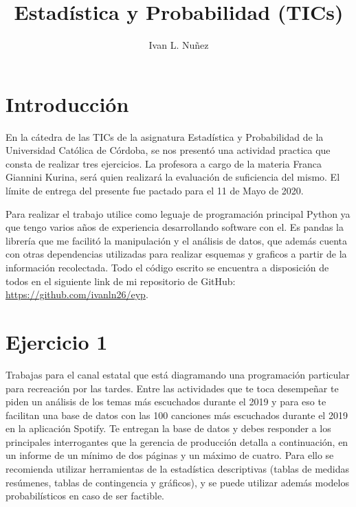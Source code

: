 \documentclass{article}
\title{Estadística y Probabilidad (TICs)}
\author{Ivan L. Nuñez}
\date{}
\begin{document}
\begin{titlepage}
  \maketitle
  \thispagestyle{empty}
\end{titlepage}

\newpage
\renewcommand{\contentsname}{Índice}
\tableofcontents

\newpage
\section{Introducción}
En la cátedra de las TICs de la asignatura Estadística y Probabilidad de la
Universidad Católica de Córdoba, se nos presentó una actividad practica que
consta de realizar tres ejercicios. La profesora a cargo de la materia Franca
Giannini Kurina, será quien realizará la evaluación de suficiencia del mismo.
El límite de entrega del presente fue pactado para el 11 de Mayo de 2020.

Para realizar el trabajo utilice como leguaje de programación principal
Python ya que tengo varios años de experiencia desarrollando software con el.
Es pandas la librería que me facilitó la manipulación y el análisis de datos,
que además cuenta con otras dependencias utilizadas para realizar esquemas y
graficos a partir de la información recolectada. Todo el código escrito se
encuentra a disposición de todos en el siguiente link de mi repositorio de
GitHub: \url{https://github.com/ivanln26/eyp}.

\newpage
\section{Ejercicio 1}
Trabajas para el canal estatal que está diagramando una programación particular
para recreación por las tardes. Entre las actividades que te toca desempeñar te
piden un análisis de los temas más escuchados durante el 2019 y para eso te
facilitan una base de datos con las 100 canciones más escuchados durante el
2019 en la aplicación Spotify. Te entregan la base de datos y debes responder a
los principales interrogantes que la gerencia de producción detalla a
continuación, en un informe de un mínimo de dos páginas y un máximo de cuatro.
Para ello se recomienda utilizar herramientas de la estadística descriptivas
(tablas de medidas resúmenes, tablas de contingencia y gráficos), y se puede
utilizar además modelos probabilísticos en caso de ser factible.
\end{document}
